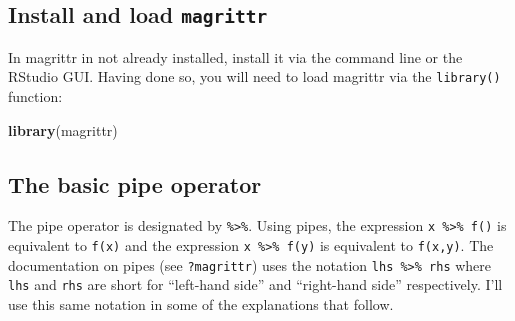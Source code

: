 \documentclass[]{book}
\newenvironment{Shaded}{\begin{snugshade}}{\end{snugshade}}
\newcommand{\KeywordTok}[1]{\textcolor[rgb]{0.13,0.29,0.53}{\textbf{#1}}}
\newcommand{\NormalTok}[1]{#1}
\theoremstyle{definition}
\theoremstyle{definition}
\theoremstyle{definition}
\theoremstyle{remark}
\begin{document}
\hypertarget{install-and-load-magrittr}{%
\subsection{\texorpdfstring{Install and load
\texttt{magrittr}}{Install and load magrittr}}\label{install-and-load-magrittr}}

In magrittr in not already installed, install it via the command line or
the RStudio GUI. Having done so, you will need to load magrittr via the
\texttt{library()} function:

\begin{Shaded}
\begin{Highlighting}[]
\KeywordTok{library}\NormalTok{(magrittr)}
\end{Highlighting}
\end{Shaded}

\hypertarget{the-basic-pipe-operator}{%
\subsection{The basic pipe operator}\label{the-basic-pipe-operator}}

The pipe operator is designated by \texttt{\%\textgreater{}\%}. Using
pipes, the expression \texttt{x\ \%\textgreater{}\%\ f()} is equivalent
to \texttt{f(x)} and the expression \texttt{x\ \%\textgreater{}\%\ f(y)}
is equivalent to \texttt{f(x,y)}. The documentation on pipes (see
\texttt{?magrittr}) uses the notation
\texttt{lhs\ \%\textgreater{}\%\ rhs} where \texttt{lhs} and
\texttt{rhs} are short for ``left-hand side'' and ``right-hand side''
respectively. I'll use this same notation in some of the explanations
that follow.
\end{document}
